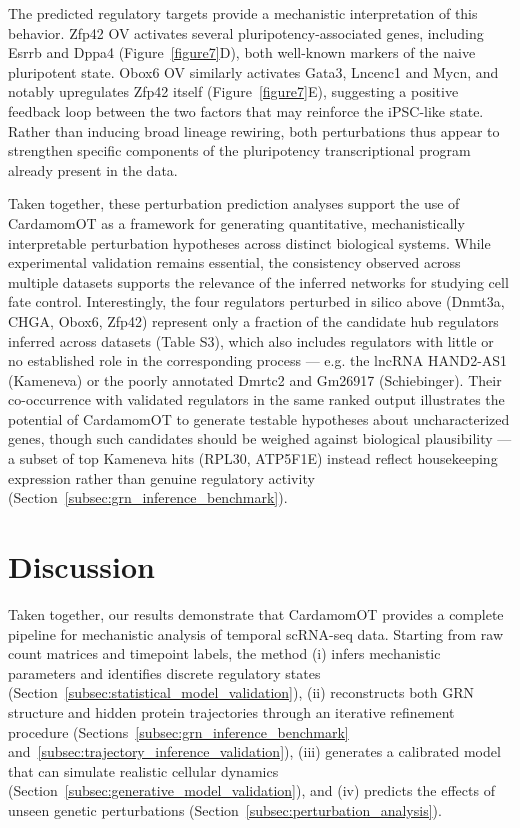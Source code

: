\documentclass[a4paper, 11pt]{article}
\theoremstyle{plain}
\theoremstyle{remark}
\newcommand*{\firstreview}[1]{{\color{black}#1}}
\begin{document}
The predicted regulatory targets provide a mechanistic interpretation of this 
behavior. {Zfp42} OV activates several pluripotency-associated genes, 
including {Esrrb} and {Dppa4} (Figure~\ref{figure7}D), both well-known 
markers of the naive pluripotent state. {Obox6} OV similarly activates 
{Gata3}, {Lncenc1} and {Mycn}, and notably upregulates {Zfp42} 
itself (Figure~\ref{figure7}E), suggesting a positive feedback loop between the 
two factors that may reinforce the iPSC-like state. Rather than inducing broad 
lineage rewiring, both perturbations thus appear to strengthen specific components 
of the pluripotency transcriptional program already present in the data.

Taken together, these perturbation \firstreview{prediction} analyses support the use of CardamomOT as a framework for generating quantitative, mechanistically interpretable perturbation hypotheses across distinct biological systems. While experimental validation remains essential, the consistency observed across multiple datasets supports the relevance of the inferred networks for studying cell fate control.
\firstreview{Interestingly, the four regulators perturbed in silico above (Dnmt3a, CHGA, Obox6, Zfp42) represent only a fraction of the candidate hub regulators inferred across datasets (Table S3), which also includes regulators with little or no established role in the corresponding process — e.g. the lncRNA HAND2-AS1 (Kameneva) or the poorly annotated Dmrtc2 and Gm26917 (Schiebinger). Their co-occurrence with validated regulators in the same ranked output illustrates the potential of CardamomOT to generate testable hypotheses about uncharacterized genes, though such candidates should be weighed against biological plausibility — a subset of top Kameneva hits (RPL30, ATP5F1E) instead reflect housekeeping expression rather than genuine regulatory activity (Section~\ref{subsec:grn_inference_benchmark}).}


\section{Discussion}
\label{discussion}

Taken together, our results demonstrate that CardamomOT provides a complete pipeline for mechanistic analysis of temporal scRNA-seq data. Starting from raw count matrices and timepoint labels, the method (i) infers mechanistic parameters and identifies discrete regulatory states (Section~\ref{subsec:statistical_model_validation}), (ii) reconstructs both GRN structure and hidden protein trajectories through an iterative refinement procedure (Sections~\ref{subsec:grn_inference_benchmark} and~\ref{subsec:trajectory_inference_validation}), (iii) generates a calibrated model that can simulate realistic cellular dynamics (Section~\ref{subsec:generative_model_validation}), and (iv) predicts the effects of unseen genetic perturbations (Section~\ref{subsec:perturbation_analysis}).
\end{document}
